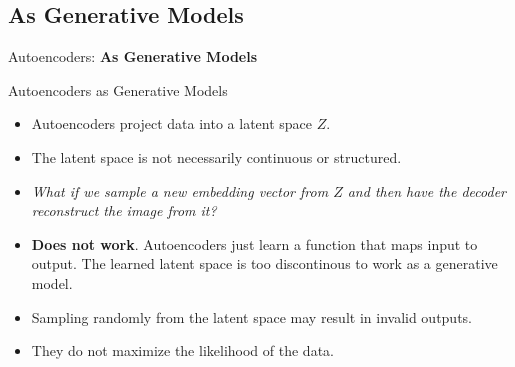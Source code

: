 \subsection{As Generative Models}
\begin{frame}{}
    \LARGE Autoencoders: \textbf{As Generative Models}
\end{frame}

\begin{frame}{Autoencoders as Generative Models}
\begin{itemize}
    \item Autoencoders project data into a latent space $Z$.
    \item The latent space is not necessarily continuous or structured.
    \item<2-> \textit{What if we sample a new embedding vector from $Z$ and then have the decoder reconstruct the image from it?}
    \item<3-> \textbf{Does not work}. Autoencoders just learn a function that maps input to output. The learned latent space is too discontinous to work as a generative model.
    \item<4-> Sampling randomly from the latent space may result in invalid outputs.
    \item<4-> They do not maximize the likelihood of the data.
\end{itemize}
\end{frame}

